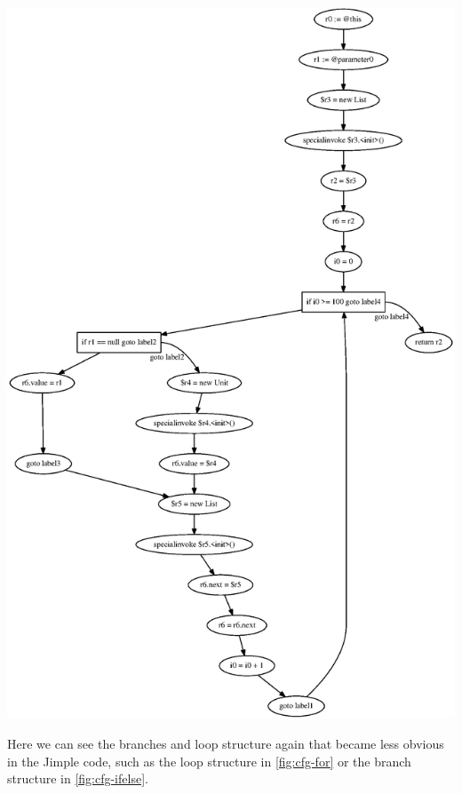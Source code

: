 \begin{example}
\includegraphics[scale=0.85]{CFG.eps}
\end{example}
Here we can see the branches and loop structure again that became less obvious in the Jimple code, such as the loop structure in \cref{fig:cfg-for} or the branch structure in \cref{fig:cfg-ifelse}.
